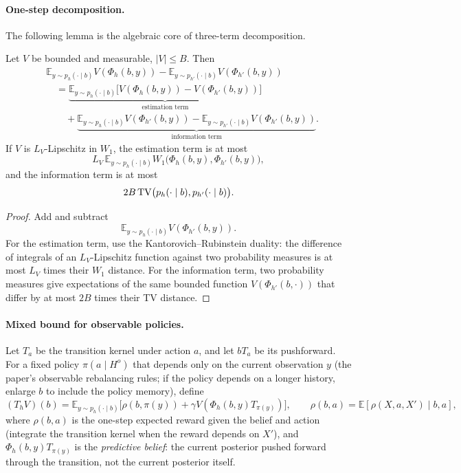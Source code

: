 \paragraph{One-step decomposition.}
The following lemma is the algebraic core of three-term decomposition.

\begin{aIILemOneStep}
Let $V$ be bounded and measurable, $|V|\le B$.  Then
\[
\begin{aligned}
&\mathbb E_{y\sim p_h(\cdot\mid b)}V(\Phi_h(b,y))
-\mathbb E_{y\sim p_{h'}(\cdot\mid b)}V(\Phi_{h'}(b,y)) \\
&\quad=
\underbrace{\mathbb E_{y\sim p_h(\cdot\mid b)}
\bigl[V(\Phi_h(b,y))-V(\Phi_{h'}(b,y))\bigr]}_{\text{estimation term}} \\
&\qquad+
\underbrace{\mathbb E_{y\sim p_h(\cdot\mid b)}V(\Phi_{h'}(b,y))
-\mathbb E_{y\sim p_{h'}(\cdot\mid b)}V(\Phi_{h'}(b,y))}_{\text{information term}}.
\end{aligned}
\]
If $V$ is $L_V$-Lipschitz in $W_1$, the estimation term is at most
\[
L_V\,\mathbb E_{y\sim p_h(\cdot\mid b)}
W_1\bigl(\Phi_h(b,y),\Phi_{h'}(b,y)\bigr),
\]
and the information term is at most
\[
2B\,\mathrm{TV}\bigl(p_h(\cdot\mid b),p_{h'}(\cdot\mid b)\bigr).
\]
\end{aIILemOneStep}

\begin{proof}
Add and subtract
\[
\mathbb E_{y\sim p_h(\cdot\mid b)}V(\Phi_{h'}(b,y)).
\]
For the estimation term, use the Kantorovich--Rubinstein duality: the difference of integrals of an
$L_V$-Lipschitz function against two probability measures is at most $L_V$ times
their $W_1$ distance.  For the information term, two probability measures give
expectations of the same bounded function $V(\Phi_{h'}(b,\cdot))$ that differ by
at most $2B$ times their TV distance.
\end{proof}

\paragraph{Mixed bound for observable policies.}
Let $T_a$ be the transition kernel under action $a$, and let $bT_a$ be its
pushforward.  For a fixed policy $\pi(a\mid H^o)$ that depends only on the
current observation $y$ (the paper's observable rebalancing rules; if the policy
depends on a longer history, enlarge $b$ to include the policy memory), define
\[
(T_hV)(b)
=\mathbb E_{y\sim p_h(\cdot\mid b)}
\bigl[\rho(b,\pi(y))+\gamma V(\Phi_h(b,y)T_{\pi(y)})\bigr],
\qquad
\rho(b,a)=\mathbb E[\rho(X,a,X')\mid b,a],
\]
where $\rho(b,a)$ is the one-step expected reward given the belief and action
(integrate the transition kernel when the reward depends on $X'$), and
$\Phi_h(b,y)T_{\pi(y)}$ is the \emph{predictive belief}: the current posterior
pushed forward through the transition, not the current posterior itself.

